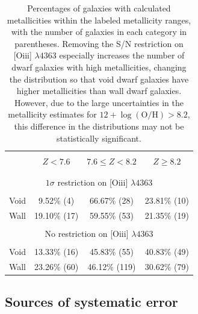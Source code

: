 \begin{table}
    \centering
    \begin{tabular}{cccc}
        \hline \\
         & $Z < 7.6$ & $7.6 \leq Z < 8.2$ & $Z \geq 8.2$\\
        \hline \\
        \hline \\
        \multicolumn{4}{c}{$1 \sigma$ restriction on [O{\sc iii}] $\lambda 4363$}\\
        \hline \\
        Void & 9.52\% (4)   & 66.67\% (28) & 23.81\% (10)\\
        Wall & 19.10\% (17) & 59.55\% (53) & 21.35\% (19)\\
        \hline \\
        \multicolumn{4}{c}{No restriction on [O{\sc iii}] $\lambda 4363$}\\
        \hline \\
        Void & 13.33\% (16) & 45.83\% (55)  & 40.83\% (49)\\
        Wall & 23.26\% (60) & 46.12\% (119) & 30.62\% (79)\\
        \hline
    \end{tabular}
    \caption[Metallicity distribution of 135 dwarf galaxy sample]{Percentages of 
    galaxies with calculated metallicities within the labeled metallicity 
    ranges, with the number of galaxies in each category in parentheses.  
    Removing the S/N restriction on [O{\sc iii}] $\lambda 4363$ especially 
    increases the number of dwarf galaxies with high metallicities, changing the 
    distribution so that void dwarf galaxies have higher metallicities than wall 
    dwarf galaxies.  However, due to the large uncertainties in the metallicity 
    estimates for $12 + \log (\text{O}/\text{H}) > 8.2$, this difference in the 
    distributions may not be statistically significant.\label{tab:Percents}}
\end{table}


\subsection{Sources of systematic error}

